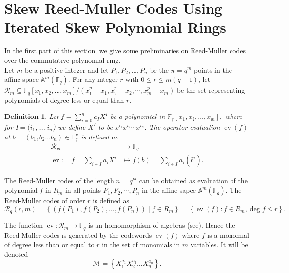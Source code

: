 \documentclass{amsproc}
\newtheorem{definition}[theorem]{Definition}
\numberwithin{equation}{section}
\begin{document}
\section{ Skew  Reed-Muller Codes Using Iterated Skew Polynomial Rings }
In the first part of this section, we give some  preliminaries on Reed-Muller codes over the commutative polynomial ring.\\
Let $m$ be a positive integer and let $P_{1}, P_{2}, \ldots, P_{n}$ be the $n=q^{m}$ points in the affine space $\mathbb{A}^{m}\left(\mathbb{F}_{q}\right) .$ For any integer $r$ with $0 \leq r \leq m(q-1)$, let $\mathcal{R}_m\subseteq \mathbb{F}_{q}\left[x_{1}, x_{2}, \ldots, x_{m}\right]/(x_1^p-x_1,x_2^p-x_2,\cdots,x_m^p-x_m)$ be the set representing polynomials of degree less or equal than $r$. 
\begin{definition}
	Let $f=\sum_{i=0}^{n} a_{I} X^{I}$ be a polynomial in $\mathbb{F}_{q}\left[x_{1}, x_{2}, \ldots, x_{m}\right],$ where for $I=(i_1,\dots,i_n$) we define $X^I$ to be $x^{i_1}x^{i_2} \cdots x^{i_n}$. The operator evaluation $\operatorname{ev}(f)$ at $b=(b_1,b_2\ldots b_n) \in \mathbb{F}^n_{q}$ is defined as
	$$
	\begin{aligned}
	\mathcal{R}_m & \rightarrow \mathbb{F}_{q} \\
	\operatorname{ev}: \quad f=\sum_{i\in I} a_{i} X^{i} & \mapsto f(b)=\sum_{i\in I} a_{i} (b^i).
	\end{aligned}
	$$
\end{definition}
The Reed-Muller codes of the length $n=q^m$ can be obtained as evaluation of the polynomial $f$ in $R_m$  in all points $P_1, P_2,\cdots,P_n$ in the affine sapce $\mathbb{A}^{m}\left(\mathbb{F}_{q}\right) .$ 	The Reed-Muller codes of order $ r $  is defined as
$$
\mathcal{R}_{q}(r, m)=\left\{\left(f\left(P_{1}\right), f\left(P_{2}\right), \ldots, f\left(P_{n}\right)\right) \mid f \in R_m\right\}=\left\{\operatorname{ev}(f): f \in R_m , \operatorname{deg} f \leqslant r\right\}.
$$ 



The function 	$\operatorname{ev}:  \mathcal{R}_m \rightarrow \mathbb{F}_{q} $ is an homomorphism of algebras (see\cite{bardet}). Hence the Reed-Muller codes is generated by the codewords	$\operatorname{ev}(f) $ where $f$ is a monomial of degree less than or equal to $r$ in the set of monomials in $m$ variables.  It will be denoted 
$$
\mathcal{M} =\left\{ X_1^{a_1}X_2^{a_2}\dots X_n^{a_n}\right\}.
$$
\end{document}
